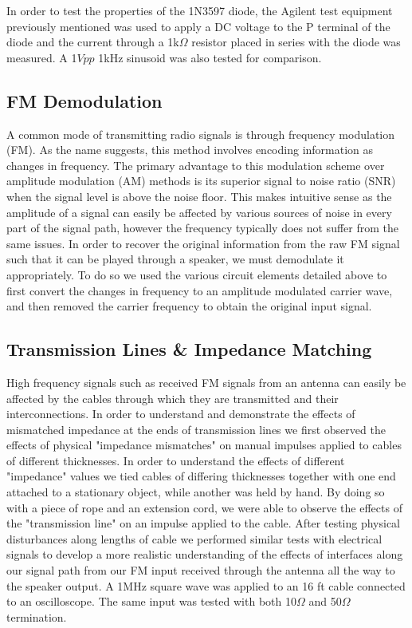 \documentclass[11pt]{article}
\begin{document}
  In order to test the properties of the 1N3597 diode, the Agilent test equipment previously mentioned was used to apply a DC voltage to the P terminal of the diode and the current through a 1k$\Omega$ resistor placed in series with the diode was measured. A 1$Vpp$ 1kHz sinusoid was also tested for comparison. 
  
  
  \subsection{FM Demodulation}
  A common mode of transmitting radio signals is through frequency modulation (FM). As the name suggests, this method involves encoding information as changes in frequency.  The primary advantage to this modulation scheme over amplitude modulation (AM) methods is its superior signal to noise ratio (SNR) when the signal level is above the noise floor. This makes intuitive sense as the amplitude of a signal can easily be affected by various sources of noise in every part of the signal path, however the frequency typically does not suffer from the same issues.
  In order to recover the original information from the raw FM signal such that it can be played through a speaker, we must demodulate it appropriately.  To do so we used the various circuit elements detailed above to first convert the changes in frequency to an amplitude modulated carrier wave, and then removed the carrier frequency to obtain the original input signal.
  
  \subsection{Transmission Lines \& Impedance Matching}
  High frequency signals such as received FM signals from an antenna can easily be affected by the cables through which they are transmitted and their interconnections.  In order to understand and demonstrate the effects of mismatched impedance at the ends of transmission lines we first observed the effects of physical "impedance mismatches" on manual impulses applied to cables of different thicknesses.  In order to understand the effects of different "impedance" values we tied cables of differing thicknesses together with one end attached to a stationary object, while another was held by hand.  By doing so with a piece of rope and an extension cord, we were able to observe the effects of the "transmission line" on an impulse applied to the cable.
  After testing physical disturbances along lengths of cable we performed similar tests with electrical signals to develop a more realistic understanding of the effects of interfaces along our signal path from our FM input received through the antenna all the way to the speaker output.  A 1MHz square wave was applied to an 16 ft cable connected to an oscilloscope.  The same input was tested with both 10$\Omega$ and 50$\Omega$ termination.
  
\end{document}
